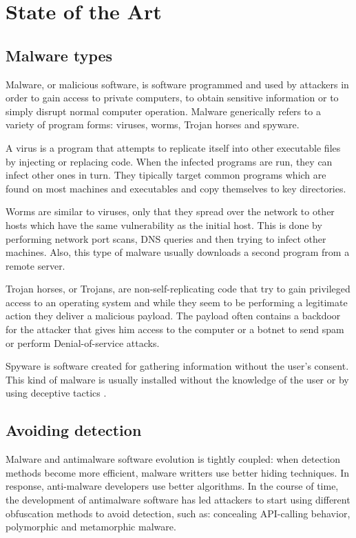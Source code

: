 \chapter{State of the Art}
\label{chapter:second-chapter}

\section{Malware types}
\label{sec:mal-types}

Malware, or malicious software, is software programmed and used by attackers in order to gain access to private computers, to obtain sensitive information or to simply disrupt normal computer operation. Malware generically refers to a variety of program forms: viruses, worms, Trojan horses and spyware.

A virus is a program that attempts to replicate itself into other executable files by injecting or replacing code. When the infected programs are run, they can infect other ones in turn. They tipically target common programs which are found on most machines and executables and copy themselves to key directories.

Worms are similar to viruses, only that they spread over the network to other hosts which have the same vulnerability as the initial host. This is done by performing network port scans, DNS queries and then trying to infect other machines. Also, this type of malware usually downloads a second program from a remote server.

Trojan horses, or Trojans, are non-self-replicating code that try to gain privileged access to an operating system and while they seem to be performing a legitimate action they deliver a malicious payload. The payload often contains a backdoor for the attacker that gives him access to the computer or a botnet to send spam or perform Denial-of-service attacks.

Spyware is software created for gathering information without the user's consent. This kind of malware is usually installed without the knowledge of the user or by using deceptive tactics \cite{mal-behavior-analysis}.

\section{Avoiding detection}
\label{sec:avoid-det}

Malware and antimalware software evolution is tightly coupled: when detection methods become more efficient, malware writters use better hiding techniques. In response, anti-malware developers use better algorithms. In the course of time, the development of antimalware software has led attackers to start using different obfuscation methods to avoid detection, such as: concealing API-calling behavior, polymorphic and metamorphic malware.

